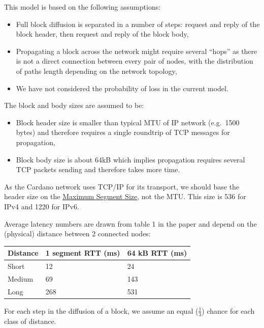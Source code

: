 \documentclass[10pt]{article}
\providecommand{\tightlist}{%
  \setlength{\itemsep}{0pt}\setlength{\parskip}{0pt}}
\begin{document}
This model is based on the following assumptions:

\begin{itemize}
\tightlist
\item
  Full block diffusion is separated in a number of steps: request and
  reply of the block header, then request and reply of the block body,
\item
  Propagating a block across the network might require several ``hops''
  as there is not a direct connection between every pair of nodes, with
  the distribution of paths length depending on the network topology,
\item
  We have not considered the probability of loss in the current model.
\end{itemize}

The block and body sizes are assumed to be:

\begin{itemize}
\tightlist
\item
  Block header size is smaller than typical MTU of IP network (e.g.~1500
  bytes) and therefore requires a single roundtrip of TCP messages for
  propagation,
\item
  Block body size is about 64kB which implies propagation requires
  several TCP packets sending and therefore takes more time.
\end{itemize}

\begin{quoting}
As the Cardano network uses TCP/IP for its transport, we
should base the header size on the
\href{https://en.wikipedia.org/wiki/Maximum_segment_size}{Maximum
Segment Size}, not the MTU. This size is 536 for IPv4 and 1220 for IPv6.
\end{quoting}

Average latency numbers are drawn from table 1 in the paper and depend
on the (physical) distance between 2 connected nodes:

\begin{longtable}[]{@{}lll@{}}
\toprule\noalign{}
Distance & 1 segment RTT (ms) & 64 kB RTT (ms) \\
\midrule\noalign{}
\endhead
\bottomrule\noalign{}
\endlastfoot
Short & 12 & 24 \\
Medium & 69 & 143 \\
Long & 268 & 531 \\
\end{longtable}

For each step in the diffusion of a block, we assume an equal
(\(\frac{1}{3}\)) chance for each class of distance.
\end{document}
